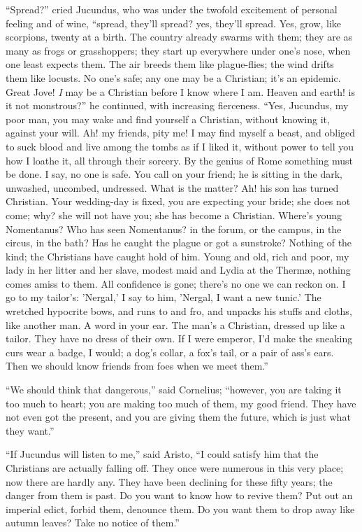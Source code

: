 ``Spread?'' cried Jucundus, who was under the twofold
excitement of personal feeling and of wine, ``spread, they'll
spread? yes, they'll spread. Yes, grow, like scorpions, twenty at a
birth. The country already swarms with them; they are as many as frogs
or grasshoppers; they start up everywhere under one's nose, when one
least expects them. The air breeds them like plague-flies; the wind
drifts them like locusts. No one's safe; any one may be a Christian;
it's an epidemic. Great Jove! \emph{I} may be a Christian before I know where
I am. Heaven and earth! is it not monstrous?'' he continued, with
increasing fierceness. ``Yes, Jucundus, my poor man, you may wake
and find yourself a Christian, without knowing it, against your
will. Ah! my friends, pity me! I may find myself a beast, and obliged
to suck blood and live among the tombs as if I liked it, without power
to tell you how I loathe it, all through their sorcery. By the genius
of Rome something must be done. I say, no one is safe. You call on
your friend; he is sitting in the dark, unwashed, uncombed, undressed.
What is the matter? Ah! his son has turned Christian. Your wedding-day
is fixed, you are expecting your bride; she does not come; why? she
will not have you; she has become a Christian. Where's young
Nomentanus? Who has seen Nomentanus? in the forum, or the campus, in
the circus, in the bath? Has he caught the plague or got a sunstroke?
Nothing of the kind; the Christians have caught hold of him. Young and
old, rich and poor, my lady in her litter and her slave, modest maid
and Lydia at the Thermæ, nothing comes amiss to them. All confidence
is gone; there's no one we can reckon on. I go to my tailor's: 'Nergal,'
I say to him, 'Nergal, I want a new tunic.' The wretched hypocrite
bows, and runs to and fro, and unpacks his stuffs and cloths, like
another man. A word in your ear. The man's a Christian, dressed up
like a tailor. They have no dress of their own. If I were emperor, I'd
make the sneaking curs wear a badge, I would; a dog's collar, a fox's
tail, or a pair of ass's ears. Then we should know friends from foes
when we meet them.''

``We should think that dangerous,'' said Cornelius;
``however, you are taking it too much to heart; you are
making too much of them, my good friend. They have not even got the
present, and you are giving them the future, which is just what they
want.''

``If Jucundus will listen to me,'' said Aristo, ``I
could satisfy him that the Christians are actually falling off. They
once were numerous in this very place; now there are hardly any. They
have been declining for these fifty years; the danger from them is
past. Do you want to know how to revive them? Put out an imperial
edict, forbid them, denounce them. Do you want them to drop away like
autumn leaves? Take no notice of them.''

